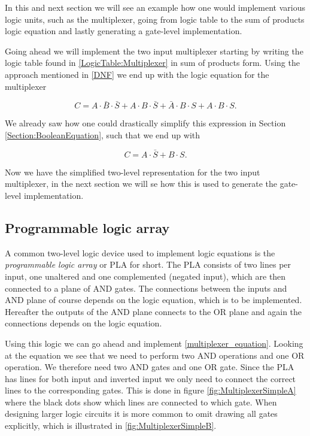             In this and next section we will see an example how one would implement various logic units, such as the multiplexer, going from logic table to the sum of products logic equation and lastly generating a gate-level implementation.
            
            Going ahead we will implement the two input multiplexer starting by writing the logic table found in \ref{LogicTable:Multiplexer} in sum of products form. Using the approach mentioned in \ref{DNF} we end up with the logic equation for the multiplexer 
            
            \begin{equation}
                C = A \cdot \bar{B} \cdot \bar{S} + A \cdot B \cdot \bar{S} + \bar{A} \cdot B \cdot S
                    + A \cdot B \cdot S.
            \end{equation}
             
            We already saw how one could drastically simplify this expression in Section \ref{Section:BooleanEquation}, such that we end up with
            
            \begin{equation}
                \label{multiplexer_equation}
                C = A\cdot \bar{S} + B\cdot S.
            \end{equation}
            
            Now we have the simplified two-level representation for the two input multiplexer, in the next section we will se how this is used to generate the gate-level implementation.
        
        \subsection{Programmable logic array}
        
            A common two-level logic device used to implement logic equations is the \textit{programmable logic array} or PLA for short. The PLA consists of two lines per input, one unaltered and one complemented (negated input), which are then connected to a plane of AND gates. The connections between the inputs and AND plane of course depends on the logic equation, which is to be implemented. Hereafter the outputs of the AND plane connects to the OR plane and again the connections depends on the logic equation.
            
            Using this logic we can go ahead and implement \ref{multiplexer_equation}. Looking at the equation we see that we need to perform two AND operations and one OR operation. We therefore need two AND gates and one OR gate. Since the PLA has lines for both input and inverted input we only need to connect the correct lines to the corresponding gates. This is done in figure \ref{fig:MultiplexerSimpleA} where the black dots show which lines are connected to which gate. When designing larger logic circuits it is more common to omit drawing all gates explicitly, which is illustrated in \ref{fig:MultiplexerSimpleB}. 
        
